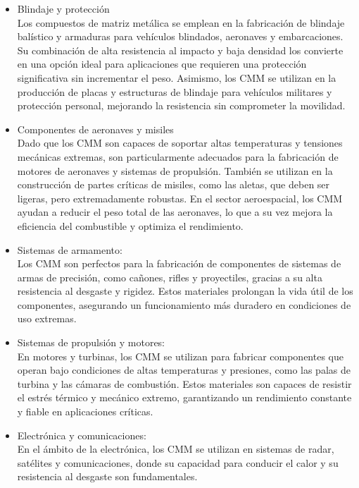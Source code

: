 \documentclass[letterpaper, 12pt]{article}
\begin{document}
\begin{itemize}
      \item Blindaje y protección \\ Los compuestos de matriz metálica se emplean en la
            fabricación de blindaje balístico y armaduras para vehículos blindados,
            aeronaves y embarcaciones. Su combinación de alta resistencia al impacto y baja
            densidad los convierte en una opción ideal para aplicaciones que requieren una
            protección significativa sin incrementar el peso. Asimismo, los CMM se utilizan
            en la producción de placas y estructuras de blindaje para vehículos militares y
            protección personal, mejorando la resistencia sin comprometer la movilidad.

      \item Componentes de aeronaves y misiles \\ Dado que los CMM son capaces de soportar
            altas temperaturas y tensiones mecánicas extremas, son particularmente
            adecuados para la fabricación de motores de aeronaves y sistemas de propulsión.
            También se utilizan en la construcción de partes críticas de misiles, como las
            aletas, que deben ser ligeras, pero extremadamente robustas. En el sector
            aeroespacial, los CMM ayudan a reducir el peso total de las aeronaves, lo que a
            su vez mejora la eficiencia del combustible y optimiza el rendimiento.

      \item Sistemas de armamento: \\ Los CMM son perfectos para la fabricación de
            componentes de sistemas de armas de precisión, como cañones, rifles y
            proyectiles, gracias a su alta resistencia al desgaste y rigidez. Estos
            materiales prolongan la vida útil de los componentes, asegurando un
            funcionamiento más duradero en condiciones de uso extremas.

      \item Sistemas de propulsión y motores: \\ En motores y turbinas, los CMM se utilizan
            para fabricar componentes que operan bajo condiciones de altas temperaturas y
            presiones, como las palas de turbina y las cámaras de combustión. Estos
            materiales son capaces de resistir el estrés térmico y mecánico extremo,
            garantizando un rendimiento constante y fiable en aplicaciones críticas.

      \item Electrónica y comunicaciones:\\ En el ámbito de la electrónica, los CMM se
            utilizan en sistemas de radar, satélites y comunicaciones, donde su capacidad
            para conducir el calor y su resistencia al desgaste son fundamentales.
\end{itemize}
\end{document}

